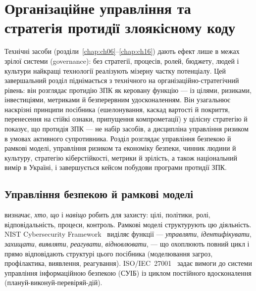 \chapter{Організаційне управління та стратегія протидії злоякісному коду}
\label{chap:ch17}

Технічні засоби (розділи~\ref{chap:ch06}--\ref{chap:ch16}) дають ефект лише в межах зрілої системи  (governance): без стратегії, процесів, ролей, бюджету, людей і культури найкращі технології реалізують мізерну частку потенціалу. Цей завершальний розділ піднімається з технічного на організаційно-стратегічний рівень: він розглядає протидію ЗПК як керовану функцію --- із цілями, ризиками, інвестиціями, метриками й безперервним удосконаленням. Він узагальнює наскрізні принципи посібника (ешелонування, каскад вартості й покриття, перенесення на стійкі ознаки, припущення компрометації) у цілісну стратегію й показує, що протидія ЗПК --- не набір засобів, а дисципліна управління ризиком в умовах активного супротивника. Розділ розглядає управління безпекою й рамкові моделі, управління ризиком та економіку безпеки, чинник людини й культуру, стратегію кіберстійкості, метрики й зрілість, а також національний вимір в Україні, і завершується кейсом побудови програми протидії ЗПК.

\section{Управління безпекою й рамкові моделі}\label{sec:ch17-governance}

 визначає, \emph{хто}, \emph{що} і \emph{навіщо} робить для захисту: цілі, політики, ролі, відповідальність, процеси, контроль. Рамкові моделі структурують цю діяльність. NIST Cybersecurity Framework~\cite{nist-csf2} виділяє функції --- \emph{управляти}, \emph{ідентифікувати}, \emph{захищати}, \emph{виявляти}, \emph{реагувати}, \emph{відновлювати}, --- що охоплюють повний цикл і прямо відповідають структурі цього посібника (моделювання загроз, профілактика, виявлення, реагування). ISO/IEC~27001~\cite{ch17:iso27001} задає вимоги до системи управління інформаційною безпекою (СУІБ) із циклом постійного вдосконалення (плануй-виконуй-перевіряй-дій).

\begin{tikzfig}
\end{tikzfig}

